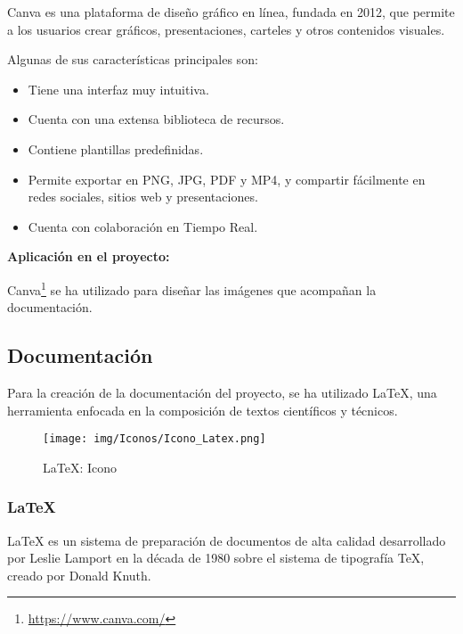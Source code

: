 \documentclass[a4paper, 12pt]{book}
\begin{document}
        Canva es una plataforma de diseño gráfico en línea, fundada en 2012, que permite a los usuarios crear gráficos, presentaciones, carteles y otros contenidos visuales.
        
        Algunas de sus características principales son:
    
        \begin{itemize}
            \item Tiene una interfaz muy intuitiva.
            \item Cuenta con una extensa biblioteca de recursos.
            \item Contiene plantillas predefinidas.
            \item Permite exportar en PNG, JPG, PDF y MP4, y compartir fácilmente en redes sociales, sitios web y presentaciones.
            \item Cuenta con colaboración en Tiempo Real.
        \end{itemize}
    
        \vspace{0.5cm} %
        \textbf{Aplicación en el proyecto:} 
        
        Canva\footnote{\url{https://www.canva.com/}} se ha utilizado para diseñar las imágenes que acompañan la documentación.
    
    
    
    
    
    
    \subsection{Documentación}  
    Para la creación de la documentación del proyecto, se ha utilizado LaTeX, una herramienta enfocada en la composición de textos científicos y técnicos.
    
        \begin{figure}[H]
            \centering
            \texttt{[image: img/Iconos/Icono\_Latex.png]}
            \caption{LaTeX: Icono}
            \label{fig:enter-label}
         \end{figure}
    \subsubsection{LaTeX}
    
        LaTeX\cite{sanguino1997iniciacion} es un sistema de preparación de documentos de alta calidad desarrollado por Leslie Lamport en la década de 1980 sobre el sistema de tipografía TeX, creado por Donald Knuth. 
        
\end{document}
